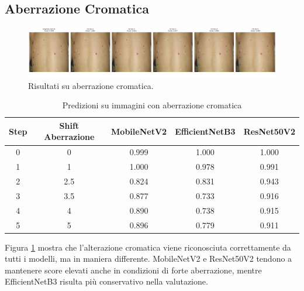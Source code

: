 \subsection{Aberrazione Cromatica}
\begin{figure}[H]
    \centering
    \includegraphics[width=\textwidth]{imgs/chromatic aberration.png}
    \caption{Risultati su aberrazione cromatica.}
    \label{fig:chromatic_aberration}
\end{figure}
\begin{table}[H]
\centering
\caption{Predizioni su immagini con aberrazione cromatica}
\begin{tabular}{c|c|c|c|c}
\toprule
\textbf{Step} & \textbf{Shift Aberrazione} & \textbf{MobileNetV2} & \textbf{EfficientNetB3} & \textbf{ResNet50V2} \\
\midrule
0 & 0   & 0.999 & 1.000 & 1.000 \\
1 & 1   & 1.000 & 0.978 & 0.991 \\
2 & 2.5 & 0.824 & 0.831 & 0.943 \\
3 & 3.5 & 0.877 & 0.733 & 0.916 \\
4 & 4   & 0.890 & 0.738 & 0.915 \\
5 & 5   & 0.896 & 0.779 & 0.911 \\
\bottomrule
\end{tabular}
\end{table}
Figura \ref{fig:chromatic_aberration} mostra che l’alterazione cromatica viene riconosciuta correttamente da tutti i modelli, ma in maniera differente. MobileNetV2 e ResNet50V2 tendono a mantenere score elevati anche in condizioni di forte aberrazione, mentre EfficientNetB3 risulta più conservativo nella valutazione.

